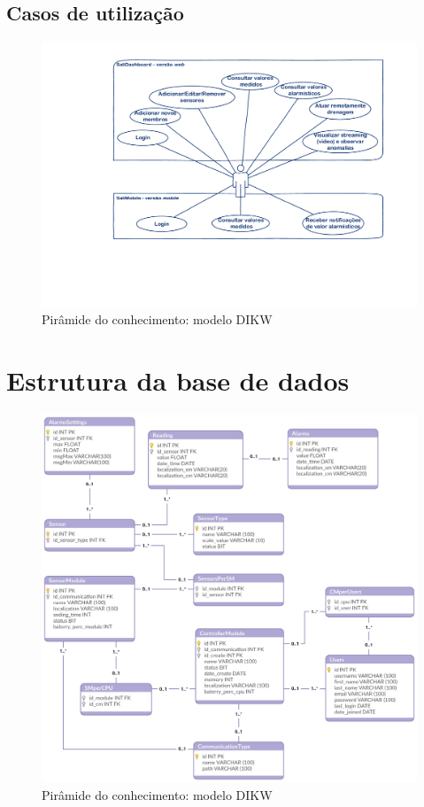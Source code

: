 \newpage

\subsection{Casos de utilização}


\begin{figure}[!htb]
	\centering
	\includegraphics[scale=0.5]{esquemas/usecases.pdf}
	\caption{Pirâmide do conhecimento: modelo DIKW}
	\label{dikw}
\end{figure}











\newpage
\section{Estrutura da base de dados}


\begin{figure}[!htb]
	\centering
	\includegraphics[scale=0.25]{esquemas/database_tese.pdf}
	\caption{Pirâmide do conhecimento: modelo DIKW}
	\label{db}
\end{figure}


